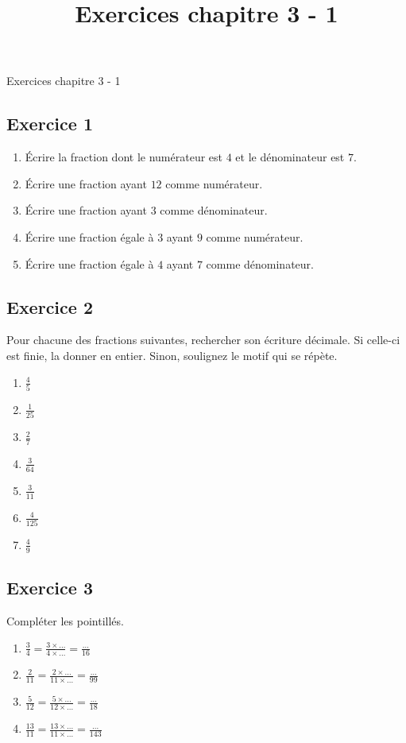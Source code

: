 \documentclass[14 pt]{extarticle}
\title{Exercices chapitre 3 - 1}
\date{}
\theoremstyle{plain}
\begin{document}
\begin{center}{\Large Exercices chapitre 3 - 1}\\ 
 \end{center}
 \subsection*{Exercice 1}
 

\begin{enumerate}
\item Écrire la fraction dont le numérateur est $4$ et le dénominateur est $7$.
\item Écrire une fraction ayant $12$ comme numérateur. 
\item Écrire une fraction ayant $3$ comme dénominateur. 
\item Écrire une fraction égale à $3$ ayant $9$ comme numérateur. 
\item Écrire une fraction égale à $4$ ayant $7$ comme dénominateur.
\end{enumerate}

\subsection*{Exercice 2 }
Pour chacune des fractions suivantes, 
rechercher son écriture décimale. Si celle-ci est finie, la donner en entier. Sinon, soulignez le motif qui se répète. 

\begin{enumerate}
\item $\frac45$
\item $\frac1{25}$ 
\item $\frac{2}{7}$
\item $\frac3{64}$ 
\item $\frac{3}{11}$
\item $\frac4{125}$ 
\item $\frac{4}{9}$
\end{enumerate}
\subsection*{Exercice 3}

Compléter les pointillés. 

\begin{enumerate}
\item $\frac34= \frac{3 \times \ldots}{4 \times \ldots}= 
\frac{\ldots}{16}$
\item $\frac2{11}= \frac{2 \times \ldots}{11 \times \ldots}= 
\frac{\ldots}{99}$
\item $\frac5{12}=  \frac{5 \times \ldots}{12 \times \ldots}= 
\frac{\ldots}{18}$
\item $\frac{13}{11}=  \frac{13 \times \ldots}{11 \times \ldots}= 
\frac{\ldots}{143}$
\end{enumerate}
\end{document}

